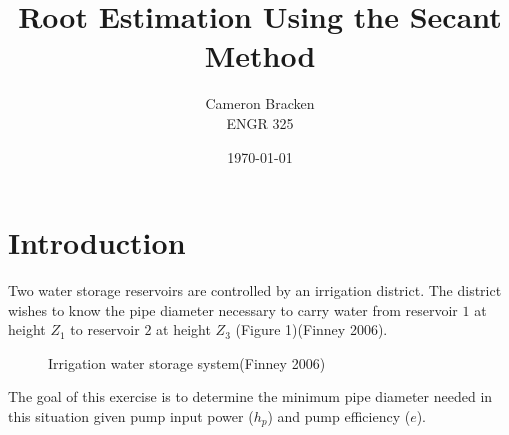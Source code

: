 \documentclass[titlepage,11pt]{article}
\begin{document}
\def\p{\phantom{0}}
\def\m{\phantom{-}}

\onehalfspacing
\begin{singlespace}
\title{Root Estimation Using the Secant Method}
\author{Cameron Bracken \\ENGR 325}
\date{\today}
\maketitle \newpage

\newpage{}\pagestyle{myheadings}
\tableofcontents {}
\listoffigures {}
\listoftables \newpage
\end{singlespace}
\pagestyle{headings}

\section {Introduction}
Two water storage reservoirs are controlled by an irrigation
district. The district wishes to know the pipe diameter necessary to
carry water from reservoir $1$ at height $Z_1$ to reservoir $2$ at
height $Z_3$ (Figure 1)(Finney 2006).

\begin{figure}[h]
\begin{center}
 \caption{Irrigation
water storage system(Finney 2006)}
\end{center}
\end{figure}

The goal of this exercise is to determine the minimum pipe diameter
needed in this situation given pump input power ($h_p$) and pump
efficiency ($e$).
\end{document}

